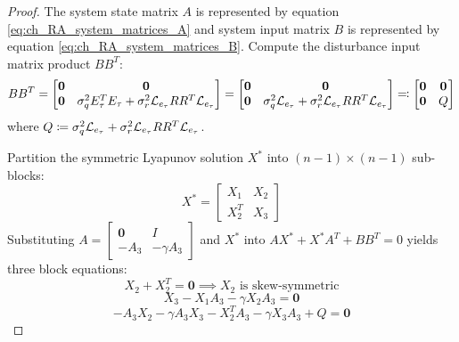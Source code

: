 \begin{proof}
The system state matrix $A$ is represented by equation \eqref{eq:ch_RA_system_matrices_A} and system input matrix $B$ is represented by equation \eqref{eq:ch_RA_system_matrices_B}.
Compute the disturbance input matrix product $B B^T$:
\begin{equation}\label{eq:ch_RA_BBT_calc}
	B B^T = \begin{bmatrix} \mathbf{0} & \mathbf{0} \\ \mathbf{0} & \sigma_q^2 E_\tau^T E_\tau + \sigma_r^2 \mathcal{L}_{e_{\tau}} R R^T \mathcal{L}_{e_{\tau}} \end{bmatrix} = \begin{bmatrix} \mathbf{0} & \mathbf{0} \\ \mathbf{0} & \sigma_q^2 \mathcal{L}_{e_{\tau}} + \sigma_r^2 \mathcal{L}_{e_{\tau}} R R^T \mathcal{L}_{e_{\tau}} \end{bmatrix} \eqcolon \begin{bmatrix} \mathbf{0} & \mathbf{0} \\ \mathbf{0} & Q \end{bmatrix}
\end{equation}
where $Q \coloneqq \sigma_q^2 \mathcal{L}_{e_{\tau}} + \sigma_r^2 \mathcal{L}_{e_{\tau}} R R^T \mathcal{L}_{e_{\tau}}$.

Partition the symmetric Lyapunov solution $X^*$ into $(n-1) \times (n-1)$ sub-blocks:
\begin{equation}\label{eq:ch_RA_X_trial}
	X^* = \begin{bmatrix} X_1 & X_2 \\ X_2^T & X_3 \end{bmatrix}
\end{equation}
Substituting $A = \begin{bmatrix} \mathbf{0} & I \\ -A_3 & -\gamma A_3 \end{bmatrix}$ and $X^*$ into $A X^* + X^* A^T + B B^T = 0$ yields three block equations:
\begin{equation}\label{eq:ch_RA_lyap_block1}
	X_2 + X_2^T = \mathbf{0} \implies X_2 \text{ is skew-symmetric}
\end{equation}
\begin{equation}\label{eq:ch_RA_lyap_block2}
	X_3 - X_1 A_3 - \gamma X_2 A_3 = \mathbf{0}
\end{equation}
\begin{equation}\label{eq:ch_RA_lyap_block3}
	-A_3 X_2 - \gamma A_3 X_3 - X_2^T A_3 - \gamma X_3 A_3 + Q = \mathbf{0}
\end{equation}


\end{proof}
